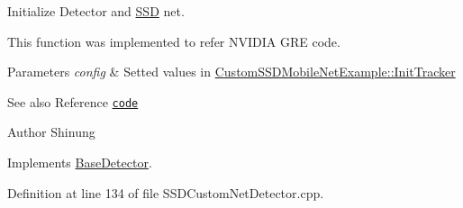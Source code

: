 Initialize Detector and \mbox{\hyperlink{class_s_s_d}{S\+SD}} net. 

This function was implemented to refer N\+V\+I\+D\+IA G\+RE code.


\begin{DoxyParams}{Parameters}
{\em config} & Setted values in \mbox{\hyperlink{class_custom_s_s_d_mobile_net_example_a5d5c5184860ac247bd2f562d6678e5e2}{Custom\+S\+S\+D\+Mobile\+Net\+Example\+::\+Init\+Tracker}} \\
\hline
\end{DoxyParams}
\begin{DoxySeeAlso}{See also}
Reference \href{https://github.com/Shinung/gpu-rest-engine/blob/ssd_gre/caffe_ssd/detection.cpp}{\tt code} 
\end{DoxySeeAlso}
\begin{DoxyAuthor}{Author}
Shinung 
\end{DoxyAuthor}


Implements \mbox{\hyperlink{class_base_detector_a44c53608e9e4e3455ff553d987165260}{Base\+Detector}}.



Definition at line 134 of file S\+S\+D\+Custom\+Net\+Detector.\+cpp.


